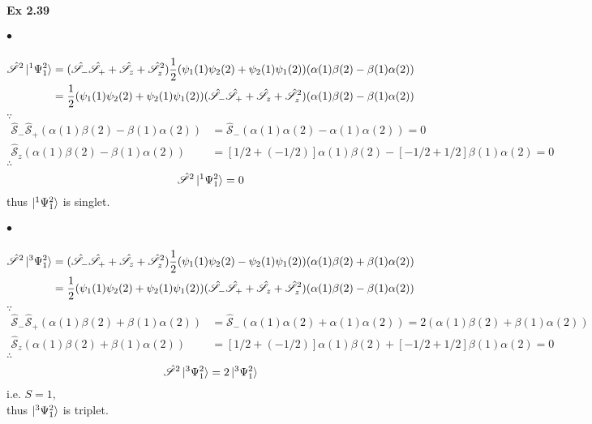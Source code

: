 \documentclass[a4paper]{article}
\newcommand{\hsS}{\hat{\mathscr{S}}}
\newcommand{\ex}[1]{\paragraph{Ex #1}}
\newcommand{\subex}[1]{\subparagraph{#1}}
\numberwithin{equation}{subsection}
\begin{document}
\ex{2.39}
\subex{$ \bullet $}
\begin{align}
\hsS^2\ket{^1\Psi_1^2} &= (\hsS_-\hsS_+ + \hsS_z + \hsS_z^2)\dfrac{1}{2}(\psi_1(1)\psi_2(2) + \psi_2(1)\psi_1(2))(\alpha(1)\beta(2) - \beta(1)\alpha(2)) \notag\\
&= \dfrac{1}{2}(\psi_1(1)\psi_2(2) + \psi_2(1)\psi_1(2))(\hsS_-\hsS_+ + \hsS_z + \hsS_z^2)(\alpha(1)\beta(2) - \beta(1)\alpha(2))
\end{align}
$ \because $
\begin{align}
\hsS_-\hsS_+ (\alpha(1)\beta(2) - \beta(1)\alpha(2)) &= \hsS_-(\alpha(1)\alpha(2) - \alpha(1)\alpha(2)) = 0\\
\hsS_z (\alpha(1)\beta(2) - \beta(1)\alpha(2)) &= [1/2+(-1/2)]\alpha(1)\beta(2) - [-1/2+1/2]\beta(1)\alpha(2) = 0
\end{align}
$ \therefore $
\begin{equation}\label{key}
\hsS^2\ket{^1\Psi_1^2} = 0
\end{equation}
thus $ \ket{^1\Psi_1^2} $ is singlet.
\subex{$ \bullet $}
\begin{align}
\hsS^2\ket{^3\Psi_1^2} &= (\hsS_-\hsS_+ + \hsS_z + \hsS_z^2)\dfrac{1}{2}(\psi_1(1)\psi_2(2) - \psi_2(1)\psi_1(2))(\alpha(1)\beta(2) + \beta(1)\alpha(2)) \notag\\
&= \dfrac{1}{2}(\psi_1(1)\psi_2(2) + \psi_2(1)\psi_1(2))(\hsS_-\hsS_+ + \hsS_z + \hsS_z^2)(\alpha(1)\beta(2) - \beta(1)\alpha(2))
\end{align}
$ \because $
\begin{align}
\hsS_-\hsS_+ (\alpha(1)\beta(2) + \beta(1)\alpha(2)) &= \hsS_-(\alpha(1)\alpha(2) + \alpha(1)\alpha(2)) = 2(\alpha(1)\beta(2) + \beta(1)\alpha(2))\\
\hsS_z (\alpha(1)\beta(2) + \beta(1)\alpha(2)) &= [1/2+(-1/2)]\alpha(1)\beta(2) + [-1/2+1/2]\beta(1)\alpha(2) = 0
\end{align}
$ \therefore $
\begin{equation}\label{key}
\hsS^2\ket{^3\Psi_1^2} = 2\ket{^3\Psi_1^2}
\end{equation}
i.e. $ S=1 $,\\
thus $ \ket{^3\Psi_1^2} $ is triplet.
\end{document}
